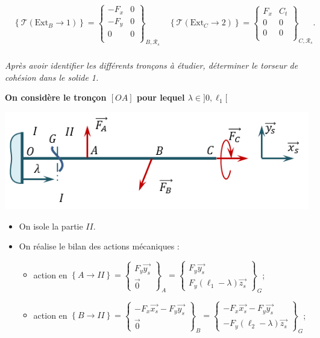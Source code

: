 \documentclass[10pt,fleqn]{article} %
\begin{document}
\begin{multicols}{2}
$$\quad
\left\{\mathcal{T} \left( \text{Ext}_B \rightarrow 1\right) \right\} =
\begin{Bmatrix}
-F_x & 0 \\
-F_y& 0 \\
0 & 0 \\
\end{Bmatrix}_{B,\mathcal{R}_s}
\quad
\left\{\mathcal{T} \left( \text{Ext}_C \rightarrow 2\right) \right\} =
\begin{Bmatrix}
F_x & C_t \\
0 & 0 \\
0 & 0 \\
\end{Bmatrix}_{C,\mathcal{R}_s}.
$$

\subparagraph{}
\textit{Après avoir identifier les différents tronçons à étudier, déterminer le torseur de cohésion dans le solide 1.}

\textbf{On considère le tronçon $[OA]$ pour lequel $\lambda \in ]0,\ell_1[$}
\begin{center}
\includegraphics[width=.5\linewidth]{images/corr_01}
\end{center}
\begin{itemize}
\item On isole la partie $II$. 
\item On réalise le bilan des actions mécaniques : 
\begin{itemize}
\item action en $\left\{ A\rightarrow II \right\}= \begin{Bmatrix} F_y\overrightarrow{y_s}\\
\overrightarrow{0}\end{Bmatrix}_A = \begin{Bmatrix} F_y\overrightarrow{y_s}\\
 F_y\left( \ell_1 - \lambda \right)\overrightarrow{z_s}\end{Bmatrix}_G$;

\item action en $\left\{ B\rightarrow II \right\}= \begin{Bmatrix} -F_x\overrightarrow{x_s}-F_y\overrightarrow{y_s}\\
\overrightarrow{0}\end{Bmatrix}_B= \begin{Bmatrix}-F_x\overrightarrow{x_s}-F_y\overrightarrow{y_s}\\
 -F_y\left( \ell_2 - \lambda \right)\overrightarrow{z_s}\end{Bmatrix}_G$;


\end{itemize}
\end{itemize}
\end{multicols}
\end{document}

